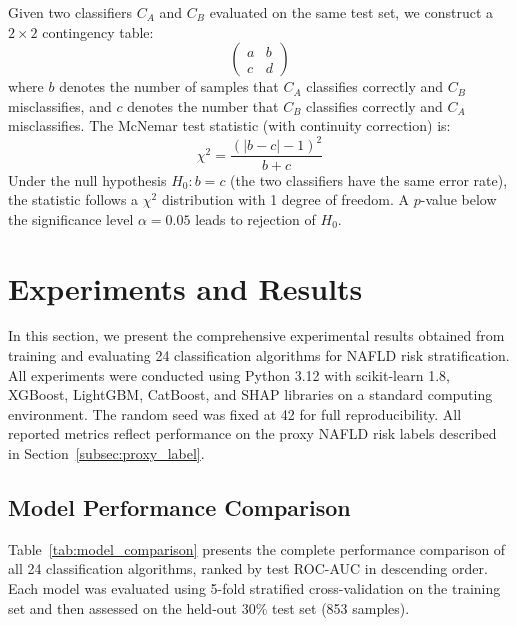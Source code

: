 \documentclass[conference,10pt]{IEEEtran}
\begin{document}
Given two classifiers $C_A$ and $C_B$ evaluated on the same test set, we construct a $2 \times 2$ contingency table:
\begin{equation}
\begin{pmatrix}
a & b \\
c & d
\end{pmatrix}
\end{equation}
where $b$ denotes the number of samples that $C_A$ classifies correctly and $C_B$ misclassifies, and $c$ denotes the number that $C_B$ classifies correctly and $C_A$ misclassifies. The McNemar test statistic (with continuity correction) is:
\begin{equation}
\chi^2 = \frac{(|b - c| - 1)^2}{b + c}
\end{equation}
Under the null hypothesis $H_0: b = c$ (the two classifiers have the same error rate), the statistic follows a $\chi^2$ distribution with 1 degree of freedom. A $p$-value below the significance level $\alpha = 0.05$ leads to rejection of $H_0$.


\section{Experiments and Results}
\label{sec:experiments}

In this section, we present the comprehensive experimental results obtained from training and evaluating 24 classification algorithms for NAFLD risk stratification. All experiments were conducted using Python 3.12 with scikit-learn 1.8, XGBoost, LightGBM, CatBoost, and SHAP libraries on a standard computing environment. The random seed was fixed at 42 for full reproducibility. All reported metrics reflect performance on the proxy NAFLD risk labels described in Section~\ref{subsec:proxy_label}.

\subsection{Model Performance Comparison}
\label{subsec:model_comparison}

Table~\ref{tab:model_comparison} presents the complete performance comparison of all 24 classification algorithms, ranked by test ROC-AUC in descending order. Each model was evaluated using 5-fold stratified cross-validation on the training set and then assessed on the held-out 30\% test set (853 samples).
\end{document}
